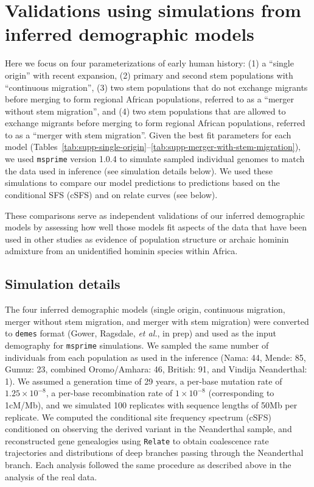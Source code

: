 \documentclass[]{article}
\newcommand{\Relate}{\texttt{Relate}\xspace}
\newcommand{\msprime}{\texttt{msprime}\xspace}
\newcommand{\demes}{\texttt{demes}\xspace}
\begin{document}
\section{Validations using simulations from inferred demographic models}

Here we focus on four parameterizations of early human history: (1) a “single
origin” with recent expansion, (2) primary and second stem populations with
“continuous migration”, (3) two stem populations that do not exchange migrants
before merging to form regional African populations, referred to as a “merger
without stem migration”, and (4) two stem populations that are allowed to
exchange migrants before merging to form regional African populations, referred
to as a “merger with stem migration”. Given the best fit parameters for each
model
(Tables~\ref{tab:supp-single-origin}--\ref{tab:supp-merger-with-stem-migration}),
we used \msprime version 1.0.4 \citep{Kelleher2016-lw,Baumdicker2022-mj} to
simulate sampled individual genomes to match the data used in inference (see
simulation details below). We used these simulations to compare our model predictions to 
predictions based on the conditional SFS (cSFS) and on relate curves (see below).  

These comparisons serve as independent validations
of our inferred demographic models by assessing how well those models fit
aspects of the data that have been used in other studies as evidence of
population structure or archaic hominin admixture from an unidentified hominin species
within Africa.

\subsection{Simulation details}

The four inferred demographic models (single origin, continuous migration,
merger without stem migration, and merger with stem migration) were converted
to \demes format (Gower, Ragsdale, \emph{et al.}, in prep) and used as
the input demography for \msprime simulations. We sampled the same
number of individuals from each population as used in the inference (Nama: 44,
Mende: 85, Gumuz: 23, combined Oromo/Amhara: 46, British: 91, and Vindija
Neanderthal: 1). We assumed a generation time of 29 years, a per-base mutation
rate of $1.25\times10^{-8}$, a per-base recombination rate of $1\times10^{-8}$
(corresponding to 1cM/Mb), and we simulated 100 replicates with sequence
lengths of 50Mb per replicate. We computed the conditional site frequency
spectrum (cSFS) conditioned on observing the derived variant in the Neanderthal
sample, and reconstructed gene genealogies using \Relate to obtain coalescence
rate trajectories and distributions of deep branches passing through the
Neanderthal branch. Each analysis followed the same procedure as described
above in the analysis of the real data.
\end{document}
